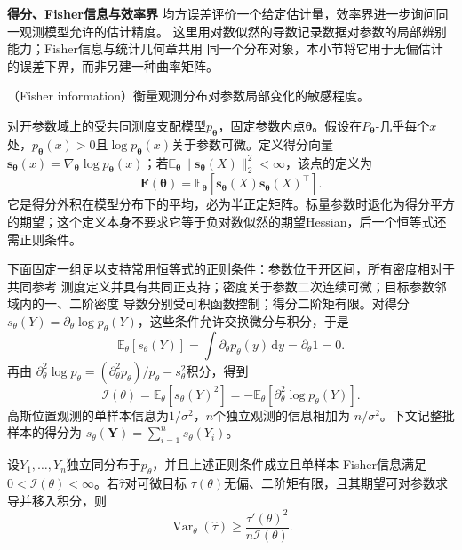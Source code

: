 \par\medskip\noindent\textbf{得分、Fisher信息与效率界}\quad
均方误差评价一个给定估计量，效率界进一步询问同一观测模型允许的估计精度。
这里用对数似然的导数记录数据对参数的局部辨别能力；Fisher信息与统计几何章共用
同一个分布对象，本小节将它用于无偏估计的误差下界，而非另建一种曲率矩阵。

（Fisher information）衡量观测分布对参数局部变化的敏感程度。

\begin{definition}[Fisher信息矩阵]
\label{def:information-fisher-matrix}
对开参数域上的受共同测度支配模型\(p_{\bm\theta}\)，固定参数内点\(\bm\theta\)。假设在\(P_{\bm\theta}\)-几乎每个\(x\)处，\(p_{\bm\theta}(x)>0\)且\(\log p_{\bm\theta}(x)\)关于参数可微。定义得分向量\(\bm s_{\bm\theta}(x)=\nabla_{\bm\theta}\log p_{\bm\theta}(x)\)；若\(\mathbb E_{\bm\theta}\lVert\bm s_{\bm\theta}(X)\rVert_2^2<\infty\)，该点的定义为
\begin{equation}
  \bm{F}(\bm{\theta})
  =
  \mathbb{E}_{\bm{\theta}}\!\left[
    \bm{s}_{\bm{\theta}}(X)
    \bm{s}_{\bm{\theta}}(X)^{\top}
  \right].
  \label{eq:information-fisher-matrix}
\end{equation}
它是得分外积在模型分布下的平均，必为半正定矩阵。标量参数时退化为得分平方的期望；这个定义本身不要求它等于负对数似然的期望Hessian，后一个恒等式还需正则条件。
\end{definition}

下面固定一组足以支持常用恒等式的正则条件：参数位于开区间，所有密度相对于共同参考
测度定义并具有共同正支持；密度关于参数二次连续可微；目标参数邻域内的一、二阶密度
导数分别受可积函数控制；得分二阶矩有限。对得分
\(s_\theta(Y)=\partial_\theta\log p_\theta(Y)\)，这些条件允许交换微分与积分，于是
\[
  \mathbb{E}_\theta[s_\theta(Y)]
  =\int\partial_\theta p_\theta(y)\,\mathrm dy
  =\partial_\theta1=0.
\]
再由
\(\partial_\theta^2\log p_\theta
=(\partial_\theta^2p_\theta)/p_\theta-s_\theta^2\)积分，得到
\[
  \mathcal I(\theta)
  =\mathbb{E}_\theta[s_\theta(Y)^2]
  =-\mathbb{E}_\theta[\partial_\theta^2\log p_\theta(Y)].
\]
高斯位置观测的单样本信息为\(1/\sigma^2\)，\(n\)个独立观测的信息相加为
\(n/\sigma^2\)。下文记整批样本的得分为
\(s_\theta(\bm Y)=\sum_{i=1}^n s_\theta(Y_i)\)。

\begin{theorem}
\label{thm:statistics-cramer-rao}
设\(Y_1,\ldots,Y_n\)独立同分布于\(p_\theta\)，并且上述正则条件成立且单样本
Fisher信息满足\(0<\mathcal I(\theta)<\infty\)。若\(\widehat\tau\)对可微目标
\(\tau(\theta)\)无偏、二阶矩有限，且其期望可对参数求导并移入积分，则
\[
  \operatorname{Var}_\theta(\widehat\tau)
  \geq\frac{\tau'(\theta)^2}{n\mathcal I(\theta)}.
\]
\end{theorem}

